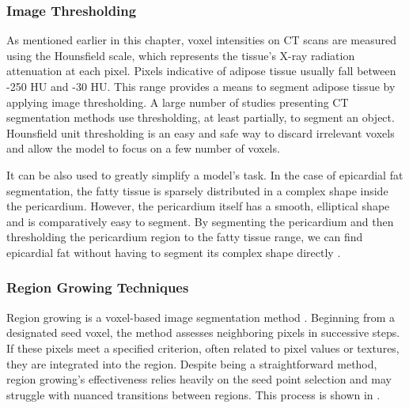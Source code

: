 \subsubsection{Image Thresholding}

As mentioned earlier in this chapter, voxel intensities on CT scans are measured using the Hounsfield scale, which represents the tissue's X-ray radiation attenuation at each pixel. Pixels indicative of adipose tissue usually fall between -250 HU and -30 HU. This range provides a means to segment adipose tissue by applying image thresholding. A large number of studies presenting CT segmentation methods use thresholding, at least partially, to segment an object. Hounsfield unit thresholding is an easy and safe way to discard irrelevant voxels and allow the model to focus on a few number of voxels. 

It can be also used to greatly simplify a model's task. In the case of epicardial fat segmentation, the fatty tissue is sparsely distributed in a complex shape inside the pericardium. However, the pericardium itself has a smooth, elliptical shape and is comparatively easy to segment. By segmenting the pericardium and then thresholding the pericardium region to the fatty tissue range, we can find epicardial fat without having to segment its complex shape directly \cite{bencevicRecentProgressEpicardial2022}.

\subsubsection{Region Growing Techniques}

Region growing is a voxel-based image segmentation method \citep{regionGrowing}. Beginning from a designated seed voxel, the method assesses neighboring pixels in successive steps. If these pixels meet a specified criterion, often related to pixel values or textures, they are integrated into the region. Despite being a straightforward method, region growing's effectiveness relies heavily on the seed point selection and may struggle with nuanced transitions between regions. This process is shown in .

